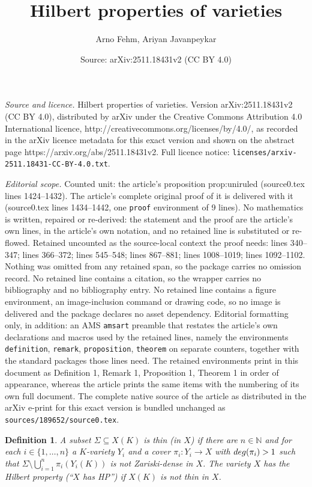\documentclass[10pt,a4paper]{amsart}
\title{Hilbert properties of varieties}
\author{Arno Fehm, Ariyan Javanpeykar}
\date{Source: arXiv:2511.18431v2 (CC BY 4.0)}
\newtheorem{definition}{Definition}
\begin{document}
\maketitle

\noindent\emph{Source and licence.} Hilbert properties of varieties. Version arXiv:2511.18431v2 (CC BY 4.0), distributed by arXiv under the Creative Commons Attribution 4.0 International licence, http://creativecommons.org/licenses/by/4.0/, as recorded in the arXiv licence metadata for this exact version and shown on the abstract page https://arxiv.org/abs/2511.18431v2. Full licence notice: \texttt{licenses/arxiv-2511.18431-CC-BY-4.0.txt}.\par\smallskip

\noindent\textit{Editorial scope.} Counted unit: the article's proposition prop:uniruled (source0.tex lines 1424--1432). The article's complete original proof of it is delivered with it (source0.tex lines 1434--1442, one \texttt{proof} environment of 9 lines). No mathematics is written, repaired or re-derived: the statement and the proof are the article's own lines, in the article's own notation, and no retained line is substituted or re-flowed.  Retained uncounted as the source-local context the proof needs: lines 340--347; lines 366--372; lines 545--548; lines 867--881; lines 1008--1019; lines 1092--1102.  Nothing was omitted from any retained span, so the package carries no omission record.  No retained line contains a citation, so the wrapper carries no bibliography and no bibliography entry.  No retained line contains a figure environment, an image-inclusion command or drawing code, so no image is delivered and the package declares no asset dependency.  Editorial formatting only, in addition: an AMS \texttt{amsart} preamble that restates the article's own declarations and macros used by the retained lines, namely the environments \texttt{definition}, \texttt{remark}, \texttt{proposition}, \texttt{theorem} on separate counters, together with the standard packages those lines need.  The retained environments print in this document as Definition 1, Remark 1, Proposition 1, Theorem 1 in order of appearance, whereas the article prints the same items with the numbering of its own full document.  The complete native source of the article as distributed in the arXiv e-print for this exact version is bundled unchanged as \texttt{sources/189652/source0.tex}.
\begin{definition}\label{def:thin}\label{def:HP}
A subset $\Sigma\subseteq X(K)$ is \emph{thin (in $X$)} if there are $n\in\mathbb{N}$
and for each $i\in\{1,\dots,n\}$ a $K$-variety $Y_i$ and a cover $\pi_i\colon Y_i\to X$
with ${\rm deg}(\pi_i)>1$ such that
$\Sigma \setminus \bigcup_{i=1}^n \pi_i(Y_i(K))$
is not Zariski-dense in $X$. 
The variety $X$ has the {\em Hilbert property (``$X$ has HP'')} if $X(K)$ is not thin in $X$.
\end{definition}
\end{document}
